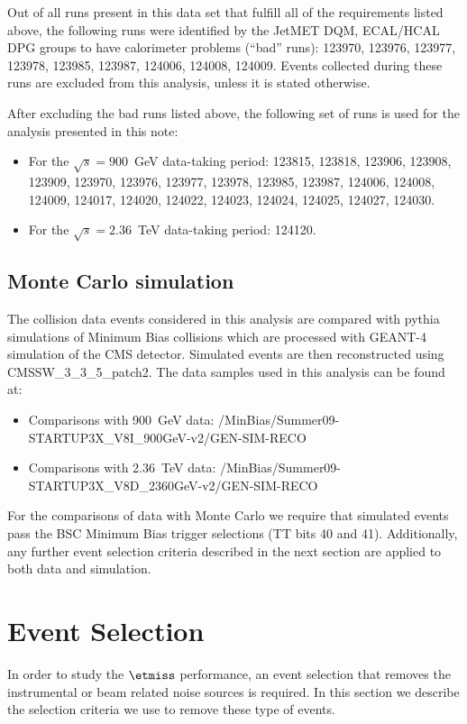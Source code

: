 Out of all runs present in this data set that fulfill all
of the requirements listed above, the following runs were identified by the
JetMET DQM, ECAL/HCAL DPG groups to have
calorimeter problems (``bad'' runs): 123970, 123976, 123977, 123978, 123985, 123987,
124006, 124008, 124009. Events collected during these runs are excluded
from this analysis, unless it is stated otherwise.

After excluding the bad runs listed above, the following set of runs is
used for the analysis presented in this note:
\begin{itemize}
\item For the $\sqrt{s}=900$~GeV data-taking period:
123815, 123818, 123906, 123908, 123909, 123970, 123976, 123977, 123978,
123985, 123987, 124006, 124008, 124009, 124017, 124020, 124022, 124023,
124024, 124025, 124027, 124030. 

\item For the $\sqrt{s}=2.36$~TeV data-taking period: 124120.

\end{itemize}

\subsection{Monte Carlo simulation}

The collision data events considered in this analysis are compared with
{\sc pythia} simulations of Minimum Bias collisions which are processed
with {\sc GEANT-4} simulation of the CMS detector. Simulated events are
then reconstructed using CMSSW\_3\_3\_5\_patch2. The data samples used in
this analysis can be found at:
\begin{itemize}
\item Comparisons with 900~GeV data: /MinBias/Summer09-STARTUP3X\_V8I\_900GeV-v2/GEN-SIM-RECO
\item Comparisons with 2.36~TeV data: /MinBias/Summer09-STARTUP3X\_V8D\_2360GeV-v2/GEN-SIM-RECO
\end{itemize}

For the comparisons of data with Monte Carlo we require that simulated
events pass the BSC Minimum Bias trigger selections (TT bits 40 and
41). Additionally, any further event selection criteria described in the next section
are applied to both data and simulation.

\section{Event Selection}
In order to study the $\etmiss$ performance, an
event selection that removes the instrumental or beam related noise
sources is required. In this section we describe the selection criteria
we use to remove these type of events.

